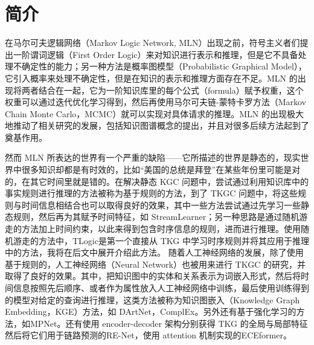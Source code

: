 \documentclass[a4paper, AutoFakeBold]{article}
\title{\mytitle}
\author{宋超}
\date{\today}
\begin{document}
\maketitle

\setcounter{page}{1}
\begin{abstract}
自知识图谱（Knowledge Graph, KG）的概念提出以来，各大企业、机构纷纷利用知识图谱构建了庞大的知识库（Knowledge Base, KB）。但是由于知识库的不完备性，如何利用已有知识预测缺失的知识，从而完善知识库这个问题被提了出来，进而出现了知识图完备（Knowledge Graph Completion, KGC）相关的研究。然而现实世界中的知识往往不是一成不变的，于是近年来又出现了带时间信息的知识库（Temporal Knowledge Base, TKB），以及相应的时序知识图完备\cite{2023survey}（Temporal Knowledge Graph Completion, TKGC，或称时序知识图推理\cite{7-2021} Temporal Knowledge Graph Reasoning，TKGR）相关的研究。本文通过调研目前主流的研究方法与分类方式，选择了我们认为具有代表性的三个框架 TLogic, MPNet, ECEformer 来介绍当前 TKGC 的最新进展。
\end{abstract}

\section{简介}

在马尔可夫逻辑网络（Markov Logic Network, MLN）出现之前，符号主义者们提出一阶谓词逻辑（First Order Logic）来对知识进行表示和推理，但是它不具备处理不确定性的能力；另一种方法是概率图模型（Probabilistic Graphical Model），它引入概率来处理不确定性，但是在知识的表示和推理方面存在不足。MLN 的出现将两者结合在一起，它为一阶知识库里的每个公式（formula）赋予权重，这个权重可以通过迭代优化学习得到，然后再使用马尔可夫链-蒙特卡罗方法\cite{20-1996}（Markov Chain Monte Carlo，MCMC）就可以实现对具体请求的推理\cite{2006mln}。MLN 的出现极大地推动了相关研究的发展，包括知识图谱概念的提出\cite{8-2024}，并且对很多后续方法起到了奠基作用。

然而 MLN 所表达的世界有一个严重的缺陷——它所描述的世界是静态的，现实世界中很多知识却都是有时效的，比如“美国的总统是拜登”在某些年份里可能是对的，在其它时间里就是错的。在解决静态 KGC 问题中，尝试通过利用知识库中的事实规则进行推理的方法被称为基于规则的方法，到了 TKGC 问题中，将这些规则与时间信息相结合也可以取得良好的效果，其中一些方法尝试通过先学习一些静态规则，然后再为其赋予时间特征，如 StreamLearner\cite{11-2019}；另一种思路是通过随机游走的方法加上时间约束，以此来得到包含时序信息的规则，进而进行推理。使用随机游走的方法中，TLogic\cite{3-2022}是第一个直接从 TKG 中学习时序规则并将其应用于推理中的方法，我将在后文中展开介绍此方法。
随着人工神经网络的发展，除了使用基于规则的，人工神经网络（Neural Network）也被用来进行 TKGC 的研究，并取得了良好的效果。其中，把知识图中的实体和关系表示为词嵌入形式，然后将时间信息按照先后顺序、或者作为属性放入人工神经网络中训练，最后使用训练得到的模型对给定的查询进行推理，这类方法被称为知识图嵌入（Knowledge Graph Embedding，KGE）方法，如 DArtNet\cite{5-2020}，ComplEx\cite{21-2016}。另外还有基于强化学习的方法，如MPNet\cite{4-2024}。还有使用 encoder-decoder 架构分别获得 TKG 的全局与局部特征然后将它们用于链路预测的RE-Net\cite{12-2020}，使用 attention 机制实现的ECEformer\cite{6-2024}。
\end{document}
